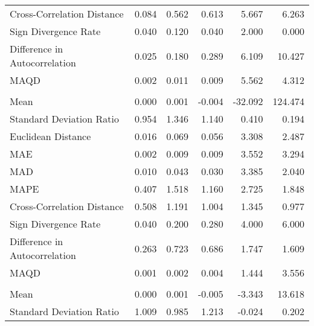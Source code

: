 \begin{landscape}
\begin{ThreePartTable}
\begin{longtable}[t]{lrrrrr}
\hspace{1em}Cross-Correlation Distance & 0.084 & 0.562 & 0.613 & 5.667 & 6.263\\
\hspace{1em}Sign Divergence Rate & 0.040 & 0.120 & 0.040 & 2.000 & 0.000\\
\hspace{1em}Difference in Autocorrelation & 0.025 & 0.180 & 0.289 & 6.109 & 10.427\\
\hspace{1em}MAQD & 0.002 & 0.011 & 0.009 & 5.562 & 4.312\\
\addlinespace[0.5em]
\multicolumn{6}{l}{\textbf{NLD}}\\
\hline
\hspace{1em}Mean & 0.000 & 0.001 & -0.004 & -32.092 & 124.474\\
\hspace{1em}Standard Deviation Ratio & 0.954 & 1.346 & 1.140 & 0.410 & 0.194\\
\hspace{1em}Euclidean Distance & 0.016 & 0.069 & 0.056 & 3.308 & 2.487\\
\hspace{1em}MAE & 0.002 & 0.009 & 0.009 & 3.552 & 3.294\\
\hspace{1em}MAD & 0.010 & 0.043 & 0.030 & 3.385 & 2.040\\
\hspace{1em}MAPE & 0.407 & 1.518 & 1.160 & 2.725 & 1.848\\
\hspace{1em}Cross-Correlation Distance & 0.508 & 1.191 & 1.004 & 1.345 & 0.977\\
\hspace{1em}Sign Divergence Rate & 0.040 & 0.200 & 0.280 & 4.000 & 6.000\\
\hspace{1em}Difference in Autocorrelation & 0.263 & 0.723 & 0.686 & 1.747 & 1.609\\
\hspace{1em}MAQD & 0.001 & 0.002 & 0.004 & 1.444 & 3.556\\
\addlinespace[0.5em]
\multicolumn{6}{l}{\textbf{NOR}}\\
\hline
\hspace{1em}Mean & 0.000 & 0.001 & -0.005 & -3.343 & 13.618\\
\hspace{1em}Standard Deviation Ratio & 1.009 & 0.985 & 1.213 & -0.024 & 0.202\\

\end{longtable}
\end{ThreePartTable}
\end{landscape}
